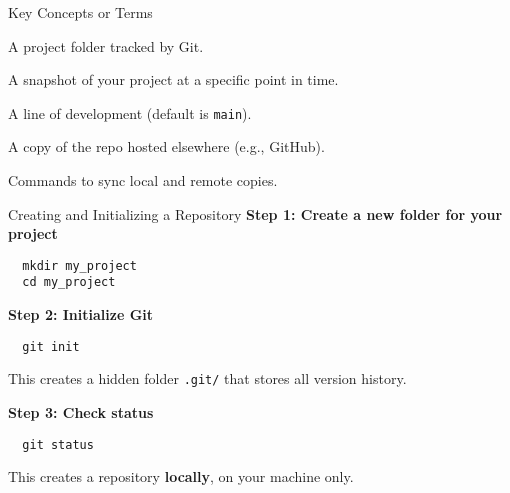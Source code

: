 \documentclass[aspectratio=169,13pt]{beamer}
\begin{document}
\begin{frame}{Key Concepts or Terms}
    \begin{description}[leftmargin=4cm, labelwidth=3cm]
        \item[Repository (repo)] A project folder tracked by Git.
        \item[Commit] A snapshot of your project at a specific point in time.
        \item[Branch] A line of development (default is \texttt{main}).
        \item[Remote] A copy of the repo hosted elsewhere (e.g., GitHub).
        \item[Clone / Push / Pull] Commands to sync local and remote copies.
    \end{description}
\end{frame}

\begin{frame}[fragile]{Creating and Initializing a Repository}
    \textbf{Step 1: Create a new folder for your project}
    \begin{verbatim}
  mkdir my_project
  cd my_project
  \end{verbatim}

    \textbf{Step 2: Initialize Git}
    \begin{verbatim}
  git init
  \end{verbatim}

    This creates a hidden folder \texttt{.git/} that stores all version history.

    \textbf{Step 3: Check status}
    \begin{verbatim}
  git status
  \end{verbatim}

    This creates a repository \textbf {locally}, on your machine only.
\end{frame}
\end{document}
